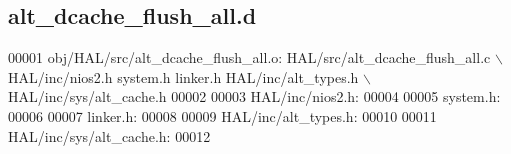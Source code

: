 \subsection{alt\+\_\+dcache\+\_\+flush\+\_\+all.\+d}
\label{alt__dcache__flush__all_8d_source}

\begin{DoxyCode}
00001 obj/HAL/src/alt_dcache_flush_all.o: HAL/src/alt_dcache_flush_all.c \(\backslash\)
 HAL/inc/nios2.h system.h linker.h HAL/inc/alt\_types.h \(\backslash\)
 HAL/inc/sys/alt\_cache.h
00002 
00003 HAL/inc/nios2.h:
00004 
00005 system.h:
00006 
00007 linker.h:
00008 
00009 HAL/inc/alt\_types.h:
00010 
00011 HAL/inc/sys/alt\_cache.h:
00012 \end{DoxyCode}
